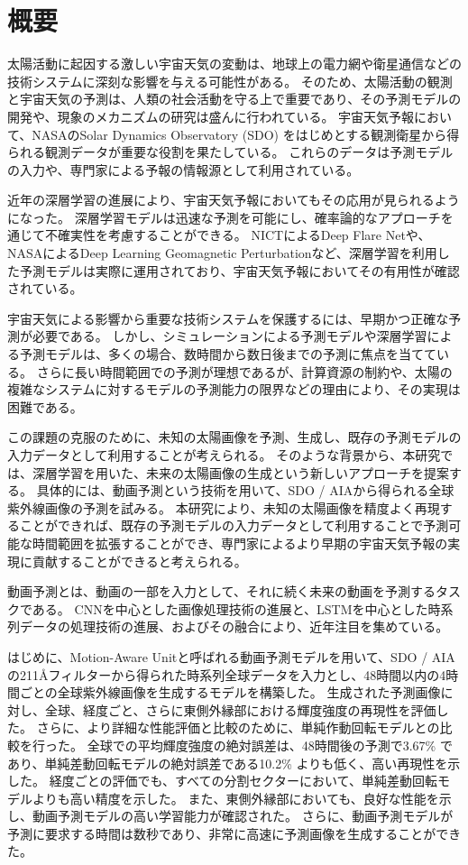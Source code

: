 \chapter*{概要}
  太陽活動に起因する激しい宇宙天気の変動は、地球上の電力網や衛星通信などの技術システムに深刻な影響を与える可能性がある。
  そのため、太陽活動の観測と宇宙天気の予測は、人類の社会活動を守る上で重要であり、その予測モデルの開発や、現象のメカニズムの研究は盛んに行われている。
  宇宙天気予報において、NASAのSolar Dynamics Observatory (SDO) をはじめとする観測衛星から得られる観測データが重要な役割を果たしている。
  これらのデータは予測モデルの入力や、専門家による予報の情報源として利用されている。
  
  近年の深層学習の進展により、宇宙天気予報においてもその応用が見られるようになった。
  深層学習モデルは迅速な予測を可能にし、確率論的なアプローチを通じて不確実性を考慮することができる。
  NICTによるDeep Flare Netや、NASAによるDeep Learning Geomagnetic Perturbationなど、深層学習を利用した予測モデルは実際に運用されており、宇宙天気予報においてその有用性が確認されている。
  
  宇宙天気による影響から重要な技術システムを保護するには、早期かつ正確な予測が必要である。
  しかし、シミュレーションによる予測モデルや深層学習による予測モデルは、多くの場合、数時間から数日後までの予測に焦点を当てている。
  さらに長い時間範囲での予測が理想であるが、計算資源の制約や、太陽の複雑なシステムに対するモデルの予測能力の限界などの理由により、その実現は困難である。

  この課題の克服のために、未知の太陽画像を予測、生成し、既存の予測モデルの入力データとして利用することが考えられる。
  そのような背景から、本研究では、深層学習を用いた、未来の太陽画像の生成という新しいアプローチを提案する。
  具体的には、動画予測という技術を用いて、SDO / AIAから得られる全球紫外線画像の予測を試みる。
  本研究により、未知の太陽画像を精度よく再現することができれば、既存の予測モデルの入力データとして利用することで予測可能な時間範囲を拡張することができ、専門家によるより早期の宇宙天気予報の実現に貢献することができると考えられる。

  動画予測とは、動画の一部を入力として、それに続く未来の動画を予測するタスクである。
  CNNを中心とした画像処理技術の進展と、LSTMを中心とした時系列データの処理技術の進展、およびその融合により、近年注目を集めている。
  
  はじめに、Motion-Aware Unitと呼ばれる動画予測モデルを用いて、SDO / AIAの211\AA フィルターから得られた時系列全球データを入力とし、48時間以内の4時間ごとの全球紫外線画像を生成するモデルを構築した。
  生成された予測画像に対し、全球、経度ごと、さらに東側外縁部における輝度強度の再現性を評価した。
  さらに、より詳細な性能評価と比較のために、単純作動回転モデルとの比較を行った。
  全球での平均輝度強度の絶対誤差は、48時間後の予測で3.67\% であり、単純差動回転モデルの絶対誤差である10.2\% よりも低く、高い再現性を示した。
  経度ごとの評価でも、すべての分割セクターにおいて、単純差動回転モデルよりも高い精度を示した。
  また、東側外縁部においても、良好な性能を示し、動画予測モデルの高い学習能力が確認された。
  さらに、動画予測モデルが予測に要求する時間は数秒であり、非常に高速に予測画像を生成することができた。

